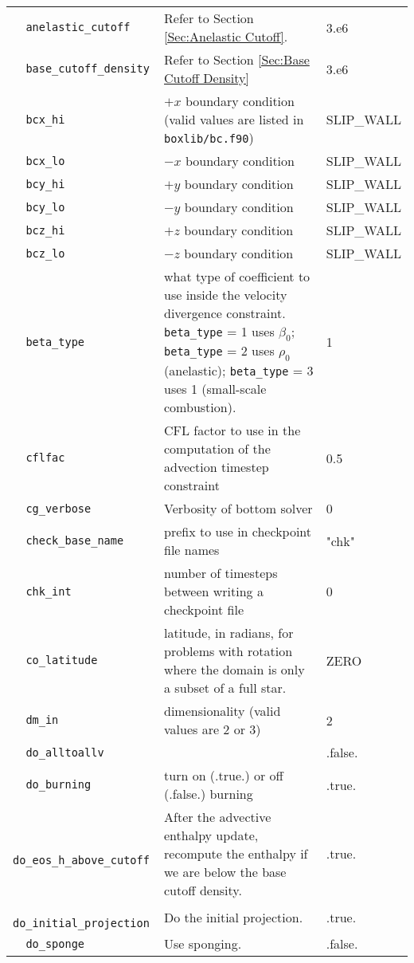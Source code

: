 {\begin{center}
\begin{longtable}{|l|p{3.25in}|l|}
\verb=  anelastic_cutoff  = &   Refer to Section \ref{Sec:Anelastic Cutoff}.  &  3.e6 \\
\verb=  base_cutoff_density  = &   Refer to Section \ref{Sec:Base Cutoff Density}  &  3.e6 \\
\verb=  bcx_hi  = &   $+x$ boundary condition (valid values are listed in {\tt  boxlib/bc.f90})  &  SLIP\_WALL \\
\verb=  bcx_lo  = &   $-x$ boundary condition  &  SLIP\_WALL \\
\verb=  bcy_hi  = &   $+y$ boundary condition  &  SLIP\_WALL \\
\verb=  bcy_lo  = &   $-y$ boundary condition  &  SLIP\_WALL \\
\verb=  bcz_hi  = &   $+z$ boundary condition  &  SLIP\_WALL \\
\verb=  bcz_lo  = &   $-z$ boundary condition  &  SLIP\_WALL \\
\verb=  beta_type  = &   what type of coefficient to use inside the velocity divergence constraint. {\tt beta\_type} = 1 uses $\beta_0$; {\tt beta\_type} = 2 uses $\rho_0$ (anelastic); {\tt beta\_type} = 3 uses 1 (small-scale combustion).  &  1 \\
\verb=  cflfac  = &   CFL factor to use in the computation of the advection timestep constraint  &  0.5 \\
\verb=  cg_verbose  = &   Verbosity of bottom solver  &  0 \\
\verb=  check_base_name  = &   prefix to use in checkpoint file names  &  "chk" \\
\verb=  chk_int  = &   number of timesteps between writing a checkpoint file  &  0 \\
\verb=  co_latitude  = &   latitude, in radians, for problems with rotation where the domain is only a subset of a full star.  &  ZERO \\
\verb=  dm_in  = &   dimensionality (valid values are 2 or 3)  &  2 \\
\verb=  do_alltoallv  = &    &  .false. \\
\verb=  do_burning  = &   turn on (.true.) or off (.false.) burning  &  .true. \\
\verb=  do_eos_h_above_cutoff  = &   After the advective enthalpy update, recompute the enthalpy if we are below the base cutoff density.  &  .true. \\
\verb=  do_initial_projection  = &   Do the initial projection.  &  .true. \\
\verb=  do_sponge  = &   Use sponging.  &  .false. \\

\end{longtable}
\end{center}}
